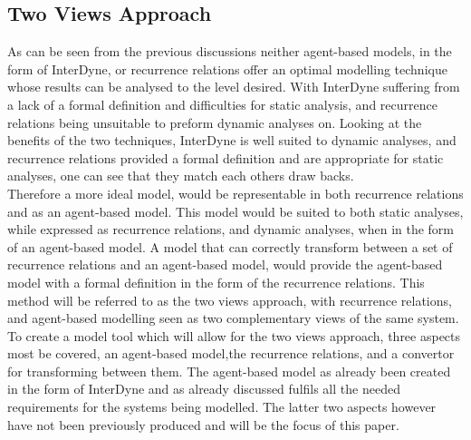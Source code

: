 \documentclass{article}
\begin{document}
\subsection{Two Views Approach} 
As can be seen from the previous discussions neither agent-based models, in the form of InterDyne, or recurrence relations offer an optimal modelling technique whose results can be analysed to the level desired. With InterDyne suffering from a lack of a formal definition and difficulties for static analysis, and recurrence relations being unsuitable to preform dynamic analyses on. Looking at the benefits of the two techniques, InterDyne is well suited to dynamic analyses, and recurrence relations provided a formal definition and are appropriate for static analyses, one can see that they match each others draw backs.\\ 
Therefore a more ideal model, would be representable in both recurrence relations and as an agent-based model.  This model would be suited to both static analyses, while expressed as recurrence relations, and dynamic analyses, when in the form of an agent-based model. A model that can correctly transform between a set of recurrence relations and an agent-based model, would provide the agent-based model with a formal definition in the form of the recurrence relations. This method will be referred to as the two views approach, with recurrence relations, and agent-based modelling seen as two complementary views of the same system.\\
To create a model tool which will allow for the two views approach, three aspects most be covered, an agent-based model,the recurrence relations, and a convertor for transforming between them. The agent-based model as already been created in the form of InterDyne and as already discussed fulfils all the needed requirements for the systems being modelled. The latter two aspects however have not been previously produced and will be the focus of this paper.      
\end{document}

